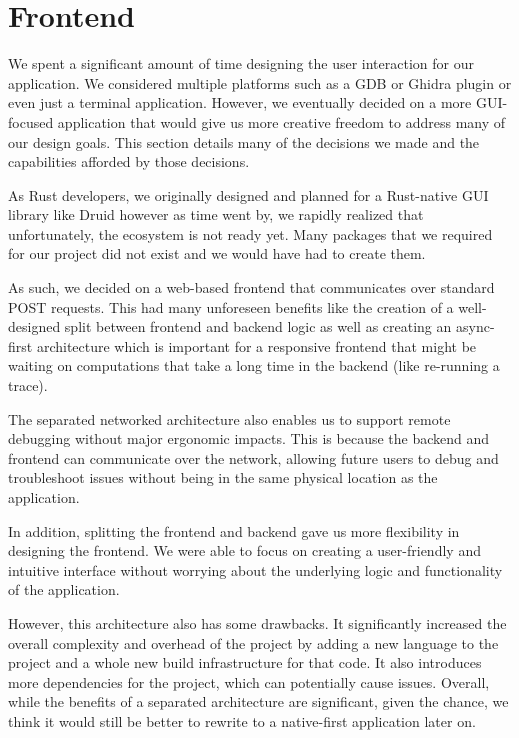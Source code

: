 \chapter{Frontend}
    \label{sec:frontend}

We spent a significant amount of time designing the user interaction for our application. We considered multiple platforms such as a GDB or Ghidra\cite{ghidra-site} plugin or even just a terminal application. However, we eventually decided on a more GUI-focused application that would give us more creative freedom to address many of our design goals. This section details many of the decisions we made and the capabilities afforded by those decisions. 

As Rust developers, we originally designed and planned for a Rust-native GUI library like Druid\cite{druid} however as time went by, we rapidly realized that unfortunately, the ecosystem is not ready yet. Many packages that we required for our project did not exist and we would have had to create them.

As such, we decided on a web-based frontend that communicates over standard POST requests. This had many unforeseen benefits like the creation of a well-designed split between frontend and backend logic as well as creating an async-first architecture which is important for a responsive frontend that might be waiting on computations that take a long time in the backend (like re-running a trace). 

The separated networked architecture also enables us to support remote debugging without major ergonomic impacts. This is because the backend and frontend can communicate over the network, allowing future users to debug and troubleshoot issues without being in the same physical location as the application.

In addition, splitting the frontend and backend gave us more flexibility in designing the frontend. We were able to focus on creating a user-friendly and intuitive interface without worrying about the underlying logic and functionality of the application.

However, this architecture also has some drawbacks. It significantly increased the overall complexity and overhead of the project by adding a new language to the project and a whole new build infrastructure for that code. It also introduces more dependencies for the project, which can potentially cause issues. Overall, while the benefits of a separated architecture are significant, given the chance, we think it would still be better to rewrite to a native-first application later on. 

